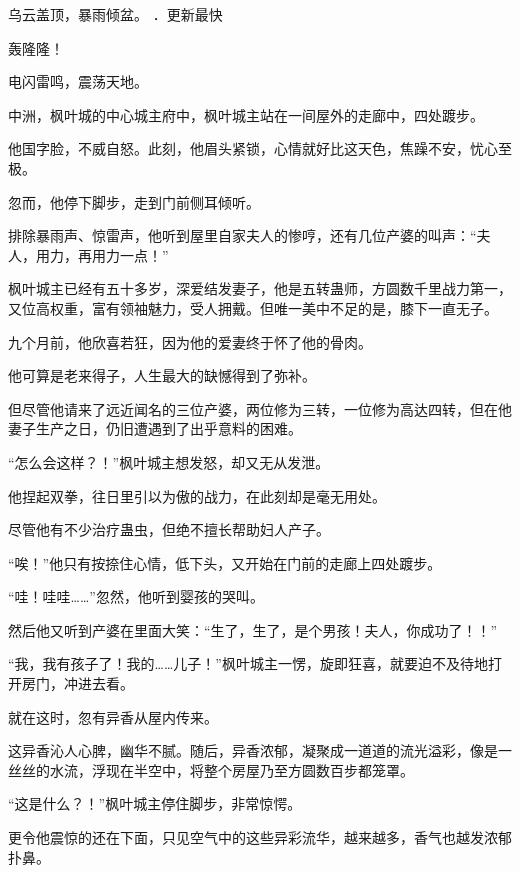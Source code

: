 
\begin{this_body}



乌云盖顶，暴雨倾盆。 ．更新最快

轰隆隆！

电闪雷鸣，震荡天地。

中洲，枫叶城的中心城主府中，枫叶城主站在一间屋外的走廊中，四处踱步。

他国字脸，不威自怒。此刻，他眉头紧锁，心情就好比这天色，焦躁不安，忧心至极。

忽而，他停下脚步，走到门前侧耳倾听。

排除暴雨声、惊雷声，他听到屋里自家夫人的惨哼，还有几位产婆的叫声：“夫人，用力，再用力一点！”

枫叶城主已经有五十多岁，深爱结发妻子，他是五转蛊师，方圆数千里战力第一，又位高权重，富有领袖魅力，受人拥戴。但唯一美中不足的是，膝下一直无子。

九个月前，他欣喜若狂，因为他的爱妻终于怀了他的骨肉。

他可算是老来得子，人生最大的缺憾得到了弥补。

但尽管他请来了远近闻名的三位产婆，两位修为三转，一位修为高达四转，但在他妻子生产之日，仍旧遭遇到了出乎意料的困难。

“怎么会这样？！”枫叶城主想发怒，却又无从发泄。

他捏起双拳，往日里引以为傲的战力，在此刻却是毫无用处。

尽管他有不少治疗蛊虫，但绝不擅长帮助妇人产子。

“唉！”他只有按捺住心情，低下头，又开始在门前的走廊上四处踱步。

“哇！哇哇……”忽然，他听到婴孩的哭叫。

然后他又听到产婆在里面大笑：“生了，生了，是个男孩！夫人，你成功了！！”

“我，我有孩子了！我的……儿子！”枫叶城主一愣，旋即狂喜，就要迫不及待地打开房门，冲进去看。

就在这时，忽有异香从屋内传来。

这异香沁人心脾，幽华不腻。随后，异香浓郁，凝聚成一道道的流光溢彩，像是一丝丝的水流，浮现在半空中，将整个房屋乃至方圆数百步都笼罩。

“这是什么？！”枫叶城主停住脚步，非常惊愕。

更令他震惊的还在下面，只见空气中的这些异彩流华，越来越多，香气也越发浓郁扑鼻。


\end{this_body}
